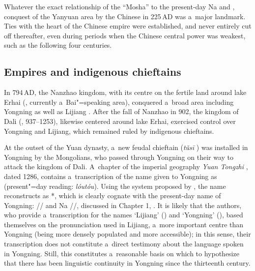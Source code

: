 Whatever the exact relationship of the “Mosha” to the present-day Na and , conquest of the Yanyuan area by the Chinese in 225\,AD was a~major landmark. Ties with the heart of the Chinese empire were established, and never entirely cut off thereafter, even during periods when the Chinese central power was weakest, such as the following four centuries. 

\subsection{Empires and indigenous chieftains}
\label{sec:feudal}


In 794\,AD, the Nanzhao  kingdom, with its centre on the fertile land around lake 
Erhai (, currently
a~Bai"=speaking area), conquered a~broad area including Yongning as well as 
Lijiang .
After the fall of Nanzhao in 902, the kingdom of 
Dali (, 937--1253), likewise centered
around lake Erhai, exercised control over Yongning and Lijiang, which remained ruled by indigenous chieftains.

At the outset of the Yuan dynasty, a~new feudal chieftain
(\textit{tǔsī} 
) was installed in Yongning by the Mongolians, who passed
through Yongning on their way to attack the kingdom of Dali. A~chapter of the imperial geography \textit{Yuan  Tongzhi} , dated 1286, contains a~transcription of the name given to Yongning as  (present"=day  reading: \textit{lóutóu}). Using the system proposed by \citet{coblin2007}, the name  reconstructs as *, which is clearly cognate with the present-day name of Yongning:  // and Na //, discussed in Chapter 1, . It is likely that the authors, who provide a~transcription for the names ‘Lijiang’ () and ‘Yongning’ (), based themselves on the pronunciation used in Lijiang, a~more important centre than Yongning (being more densely populated and more accessible); in this sense, their transcription does not constitute a~direct testimony about the language spoken in Yongning. Still, this constitutes a~reasonable basis on which to hypothesize that there has been linguistic continuity in Yongning since the thirteenth century. 

